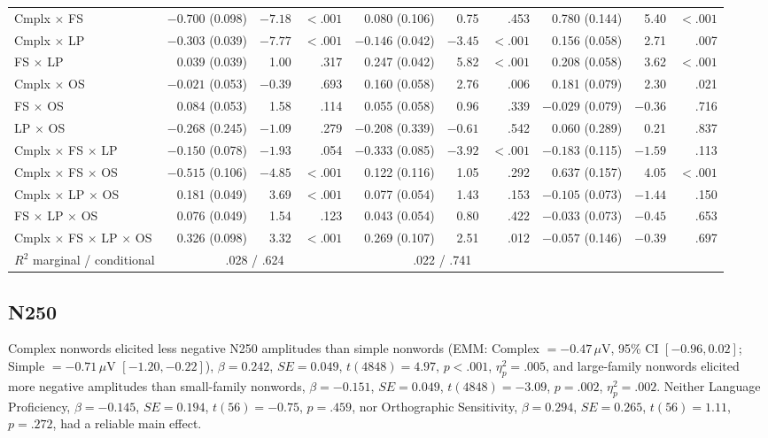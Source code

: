 \documentclass[utf8]{FrontiersinHarvard} %
\begin{document}
\begin{table}[htbp]
{\begin{tabular}{l rrr rrr rrr}
			Cmplx $\times$ FS & $-0.700$ (0.098) & $-7.18$ & $<.001$ & 0.080 (0.106) & 0.75 & .453 & 0.780 (0.144) & 5.40 & $<.001$ \\
			Cmplx $\times$ LP & $-0.303$ (0.039) & $-7.77$ & $<.001$ & $-0.146$ (0.042) & $-3.45$ & $<.001$ & 0.156 (0.058) & 2.71 & .007 \\
			FS $\times$ LP & 0.039 (0.039) & 1.00 & .317 & 0.247 (0.042) & 5.82 & $<.001$ & 0.208 (0.058) & 3.62 & $<.001$ \\
			Cmplx $\times$ OS & $-0.021$ (0.053) & $-0.39$ & .693 & 0.160 (0.058) & 2.76 & .006 & 0.181 (0.079) & 2.30 & .021 \\
			FS $\times$ OS & 0.084 (0.053) & 1.58 & .114 & 0.055 (0.058) & 0.96 & .339 & $-0.029$ (0.079) & $-0.36$ & .716 \\
			LP $\times$ OS & $-0.268$ (0.245) & $-1.09$ & .279 & $-0.208$ (0.339) & $-0.61$ & .542 & 0.060 (0.289) & 0.21 & .837 \\
			Cmplx $\times$ FS $\times$ LP & $-0.150$ (0.078) & $-1.93$ & .054 & $-0.333$ (0.085) & $-3.92$ & $<.001$ & $-0.183$ (0.115) & $-1.59$ & .113 \\
			Cmplx $\times$ FS $\times$ OS & $-0.515$ (0.106) & $-4.85$ & $<.001$ & 0.122 (0.116) & 1.05 & .292 & 0.637 (0.157) & 4.05 & $<.001$ \\
			Cmplx $\times$ LP $\times$ OS & 0.181 (0.049) & 3.69 & $<.001$ & 0.077 (0.054) & 1.43 & .153 & $-0.105$ (0.073) & $-1.44$ & .150 \\
			FS $\times$ LP $\times$ OS & 0.076 (0.049) & 1.54 & .123 & 0.043 (0.054) & 0.80 & .422 & $-0.033$ (0.073) & $-0.45$ & .653 \\
			Cmplx $\times$ FS $\times$ LP $\times$ OS & 0.326 (0.098) & 3.32 & $<.001$ & 0.269 (0.107) & 2.51 & .012 & $-0.057$ (0.146) & $-0.39$ & .697 \\
			\midrule
			$R^2$ marginal / conditional & \multicolumn{3}{c}{.028 / .624} & \multicolumn{3}{c}{.022 / .741} & & & \\
			\bottomrule
		\end{tabular}%
	}
\end{table}

\subsection{N250}

Complex nonwords elicited less negative N250 amplitudes than simple nonwords (EMM: Complex $= -0.47\,\mu$V, 95\% CI $[-0.96, 0.02]$; Simple $= -0.71\,\mu$V $[-1.20, -0.22]$), $\beta = 0.242$, $SE = 0.049$, $t(4848) = 4.97$, $p < .001$, $\eta^2_p = .005$, and large-family nonwords elicited more negative amplitudes than small-family nonwords, $\beta = -0.151$, $SE = 0.049$, $t(4848) = -3.09$, $p = .002$, $\eta^2_p = .002$. Neither Language Proficiency, $\beta = -0.145$, $SE = 0.194$, $t(56) = -0.75$, $p = .459$, nor Orthographic Sensitivity, $\beta = 0.294$, $SE = 0.265$, $t(56) = 1.11$, $p = .272$, had a reliable main effect.
\end{document}
